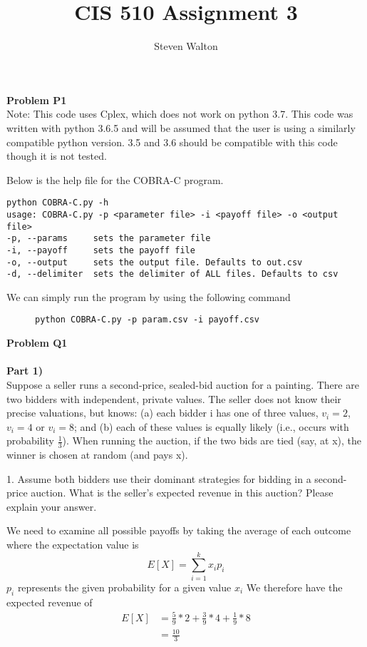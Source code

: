 \documentclass[12pt,letter]{article}
\newcommand{\problem}[1]{\vspace{3mm}\Large\textbf{{Problem {#1}\vspace{3mm}}}\normalsize\\}
\newcommand{\ppart}[1]{\vspace{2mm}\large\textbf{\\Part {#1})\vspace{2mm}}\normalsize\\}
\begin{document}
\title{CIS 510 Assignment 3}
\author{Steven Walton}
\maketitle
\problem{P1}
Note: This code uses Cplex, which does not work on python 3.7. This code was
written with python 3.6.5 and will be assumed that the user is using a similarly 
compatible python version. 3.5 and 3.6 should be compatible with this code
though it is not tested.

Below is the help file for the COBRA-C program. 
\begin{lstlisting}
python COBRA-C.py -h
usage: COBRA-C.py -p <parameter file> -i <payoff file> -o <output file>
-p, --params     sets the parameter file
-i, --payoff     sets the payoff file
-o, --output     sets the output file. Defaults to out.csv
-d, --delimiter  sets the delimiter of ALL files. Defaults to csv
\end{lstlisting}
We can simply run the program by using the following command
\begin{figure}[h]
    \centering
    \begin{lstlisting}
python COBRA-C.py -p param.csv -i payoff.csv
    \end{lstlisting}
\end{figure}

\problem{Q1}
\ppart{1}
Suppose a seller runs a second-price, sealed-bid auction for a painting.
There are two bidders with independent, private values. The seller does not know their precise
valuations, but knows: (a) each bidder i has one of three values, $v_i = 2$, 
$v_i = 4$ or $v_i = 8$; and (b)
each of these values is equally likely (i.e., occurs with probability $\frac13$).
When running the auction, if
the two bids are tied (say, at x), the winner is chosen at random (and pays x).

1. Assume both bidders use their dominant strategies for bidding in a second-price auction.
What is the seller’s expected revenue in this auction? Please explain your answer.

We need to examine all possible payoffs by taking the average of each outcome
where the expectation value is
\[
    E[X] = \sum\limits_{i=1}^{k}x_ip_i
\]
$p_i$ represents the given probability for a given value $x_i$
We therefore have the expected revenue of
\begin{align*}
    E[X] &= \frac59*2 + \frac39*4 + \frac19*8\\
    &= \frac{10}{3}
\end{align*}
\end{document}

